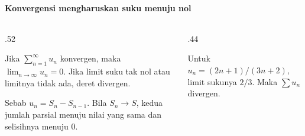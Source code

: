 \documentclass{../../kalkulus-ppt}
\begin{document}
\begin{frame}{\insertsection}
    \framesubtitle{Konvergensi mengharuskan suku menuju nol}
    \begin{columns}[c,onlytextwidth]
        \begin{column}{.52\textwidth}
            \begin{teorema}
                Jika $\sum_{n=1}^{\infty}u_n$ konvergen, maka
                $\lim_{n\to\infty}u_n=0$.
                Jika limit suku tak nol atau limitnya tidak ada,
                deret divergen.
            \end{teorema}
            Sebab $u_n=S_n-S_{n-1}$. Bila $S_n\to S$,
            kedua jumlah parsial menuju nilai yang sama dan
            selisihnya menuju $0$.
        \end{column}
        \begin{column}{.44\textwidth}
            \begin{contoh}
                Untuk $u_n=(2n+1)/(3n+2)$, limit sukunya
                $2/3$. Maka $\sum u_n$ divergen.
            \end{contoh}
        \end{column}
    \end{columns}
\end{frame}
\end{document}
